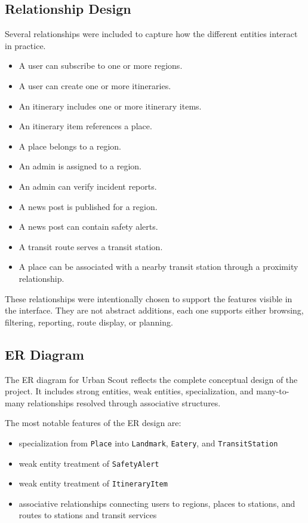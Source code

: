 \subsection{Relationship Design}

Several relationships were included to capture how the different entities interact in practice.

\begin{itemize}
    \item A user can subscribe to one or more regions.
    \item A user can create one or more itineraries.
    \item An itinerary includes one or more itinerary items.
    \item An itinerary item references a place.
    \item A place belongs to a region.
    \item An admin is assigned to a region.
    \item An admin can verify incident reports.
    \item A news post is published for a region.
    \item A news post can contain safety alerts.
    \item A transit route serves a transit station.
    \item A place can be associated with a nearby transit station through a proximity relationship.
\end{itemize}

These relationships were intentionally chosen to support the features visible in the interface. They are not abstract additions, each one supports either browsing, filtering, reporting, route display, or planning.

\subsection{ER Diagram}

The ER diagram for Urban Scout reflects the complete conceptual design of the project. It includes strong entities, weak entities, specialization, and many-to-many relationships resolved through associative structures.

The most notable features of the ER design are:
\begin{itemize}[nosep]
    \item specialization from \texttt{Place} into \texttt{Landmark}, \texttt{Eatery}, and \texttt{TransitStation}
    \item weak entity treatment of \texttt{SafetyAlert}
    \item weak entity treatment of \texttt{ItineraryItem}
    \item associative relationships connecting users to regions, places to stations, and routes to stations and transit services
\end{itemize}
\nopagebreak[4]


